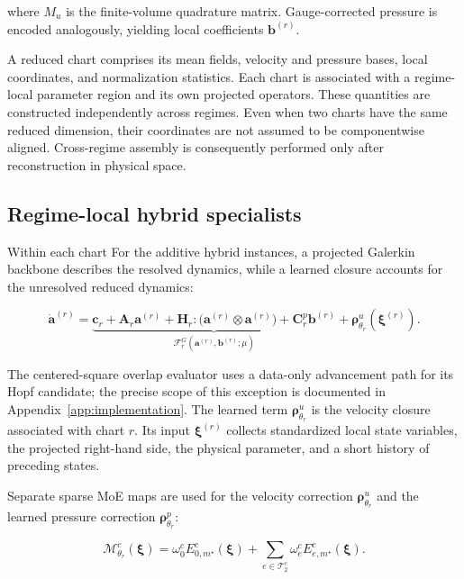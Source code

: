 \documentclass{article}
\providecommand{\DIFaddtex}[1]{{\protect\color{blue} \sf #1}} %
\providecommand{\DIFdeltex}[1]{{\protect\color{red} \scriptsize #1}} %
\providecommand{\DIFaddbegin}{} %
\providecommand{\DIFaddend}{} %
\providecommand{\DIFdelbegin}{} %
\providecommand{\DIFdelend}{} %
\providecommand{\DIFadd}[1]{\texorpdfstring{\DIFaddtex{#1}}{#1}} %
\providecommand{\DIFdel}[1]{\texorpdfstring{\DIFdeltex{#1}}{}} %
\begin{document}
where $M_u$ is the finite-volume quadrature matrix. Gauge-corrected pressure is encoded analogously, yielding local coefficients
$\bm b^{(r)}$. 

A reduced chart comprises its mean fields, velocity and pressure bases, local coordinates, and normalization statistics. Each chart is associated with a regime-local parameter region and its own projected operators.
These quantities are constructed independently across regimes. Even when two charts have the same reduced dimension, their coordinates are not assumed to be componentwise aligned. Cross-regime assembly is consequently performed only after reconstruction in physical space.

\subsection{Regime-local hybrid specialists}

\DIFdelbegin \DIFdel{Within each chart}\DIFdelend \DIFaddbegin \DIFadd{For the additive hybrid instances}\DIFaddend , a projected Galerkin backbone describes the resolved dynamics, while a learned closure accounts for the unresolved reduced dynamics:


\begin{equation}
  \dot{\bm a}^{(r)}=
  \underbrace{\bm c_r+\bm A_r\bm a^{(r)}+
  \bm H_r:\bigl(\bm a^{(r)}\otimes\bm a^{(r)}\bigr)+
  \bm C^p_r\bm b^{(r)}}_{\mathcal F_r^{G}(\bm a^{(r)},\bm b^{(r)};\mu)}
  +\bm\rho^u_{\theta_r}(\bm\xi^{(r)}).
  \label{eq:main_specialist}
\end{equation}


The \DIFaddbegin \DIFadd{centered-square overlap evaluator uses a data-only advancement path for its Hopf candidate; the precise scope of this exception is documented in Appendix~\ref{app:implementation}. The }\DIFaddend learned term $\bm\rho^u_{\theta_r}$ is the velocity closure associated with chart $r$. Its input $\bm\xi^{(r)}$ collects standardized local state variables, the projected right-hand side, the physical parameter, and a short history of preceding states.

Separate sparse MoE maps are used for the velocity correction $\bm\rho^u_{\theta_r}$ and the learned pressure correction $\bm\rho^p_{\theta_r}$:


\begin{equation}
  \mathcal M^c_{\theta_r}(\bm\xi)=
  \omega^c_0 E^c_{0,m^\star}(\bm\xi)+
  \sum_{e\in\mathcal T_2^c}\omega^c_e E^c_{e,m^\star}(\bm\xi).
  \label{eq:main_inner_moe}
\end{equation}
\end{document}

